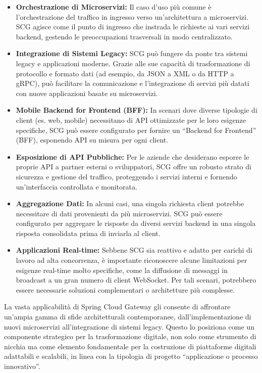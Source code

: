 \begin{itemize}
    \item \textbf{Orchestrazione di Microservizi:} Il caso d'uso più comune è l'orchestrazione del traffico in ingresso verso un'architettura a microservizi. SCG agisce come il punto di ingresso che instrada le richieste ai vari servizi backend, gestendo le preoccupazioni trasversali in modo centralizzato.
    \item \textbf{Integrazione di Sistemi Legacy:} SCG può fungere da ponte tra sistemi legacy e applicazioni moderne. Grazie alle sue capacità di trasformazione di protocollo e formato dati (ad esempio, da JSON a XML o da HTTP a gRPC), può facilitare la comunicazione e l'integrazione di servizi più datati con nuove applicazioni basate su microservizi.
    \item \textbf{Mobile Backend for Frontend (BFF):} In scenari dove diverse tipologie di client (es. web, mobile) necessitano di API ottimizzate per le loro esigenze specifiche, SCG può essere configurato per fornire un \enquote{Backend for Frontend} (BFF), esponendo API su misura per ogni client.
    \item \textbf{Esposizione di API Pubbliche:} Per le aziende che desiderano esporre le proprie API a partner esterni o sviluppatori, SCG offre un robusto strato di sicurezza e gestione del traffico, proteggendo i servizi interni e fornendo un'interfaccia controllata e monitorata.
    \item \textbf{Aggregazione Dati:} In alcuni casi, una singola richiesta client potrebbe necessitare di dati provenienti da più microservizi. SCG può essere configurato per aggregare le risposte da diversi servizi backend in una singola risposta consolidata prima di inviarla al client.
    \item \textbf{Applicazioni Real-time:} Sebbene SCG sia reattivo e adatto per carichi di lavoro ad alta concorrenza, è importante riconoscere alcune limitazioni per esigenze real-time molto specifiche, come la diffusione di messaggi in broadcast a un gran numero di client WebSocket. Per tali scenari, potrebbero essere necessarie soluzioni complementari o architetture più complesse.
\end{itemize}

La vasta applicabilità di Spring Cloud Gateway gli consente di affrontare un'ampia gamma di sfide architetturali contemporanee, dall'implementazione di nuovi microservizi all'integrazione di sistemi legacy. Questo lo posiziona come un componente strategico per la trasformazione digitale, non solo come strumento di nicchia ma come elemento fondamentale per la costruzione di piattaforme digitali adattabili e scalabili, in linea con la tipologia di progetto \enquote{applicazione o processo innovativo}.